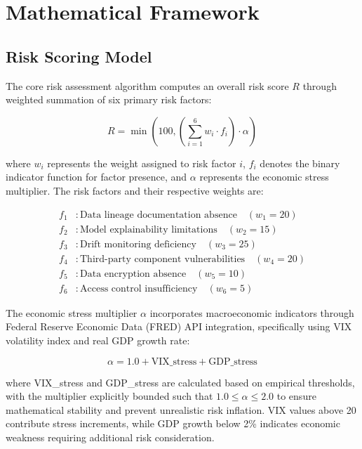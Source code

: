 \documentclass[11pt,letterpaper]{article}
\begin{document}
\section{Mathematical Framework}

\subsection{Risk Scoring Model}

The core risk assessment algorithm computes an overall risk score $R$ through weighted summation of six primary risk factors:

\begin{equation}
R = \min\left(100, \left(\sum_{i=1}^{6} w_i \cdot f_i\right) \cdot \alpha\right)
\end{equation}

where $w_i$ represents the weight assigned to risk factor $i$, $f_i$ denotes the binary indicator function for factor presence, and $\alpha$ represents the economic stress multiplier. The risk factors and their respective weights are:

\begin{align}
f_1 &: \text{Data lineage documentation absence} \quad (w_1 = 20) \\
f_2 &: \text{Model explainability limitations} \quad (w_2 = 15) \\
f_3 &: \text{Drift monitoring deficiency} \quad (w_3 = 25) \\
f_4 &: \text{Third-party component vulnerabilities} \quad (w_4 = 20) \\
f_5 &: \text{Data encryption absence} \quad (w_5 = 10) \\
f_6 &: \text{Access control insufficiency} \quad (w_6 = 5)
\end{align}

The economic stress multiplier $\alpha$ incorporates macroeconomic indicators through Federal Reserve Economic Data (FRED) API integration, specifically using VIX volatility index and real GDP growth rate:

\begin{equation}
\alpha = 1.0 + \text{VIX\_stress} + \text{GDP\_stress}
\end{equation}

where VIX\_stress and GDP\_stress are calculated based on empirical thresholds, with the multiplier explicitly bounded such that $1.0 \leq \alpha \leq 2.0$ to ensure mathematical stability and prevent unrealistic risk inflation. VIX values above 20 contribute stress increments, while GDP growth below 2\% indicates economic weakness requiring additional risk consideration.
\end{document}
